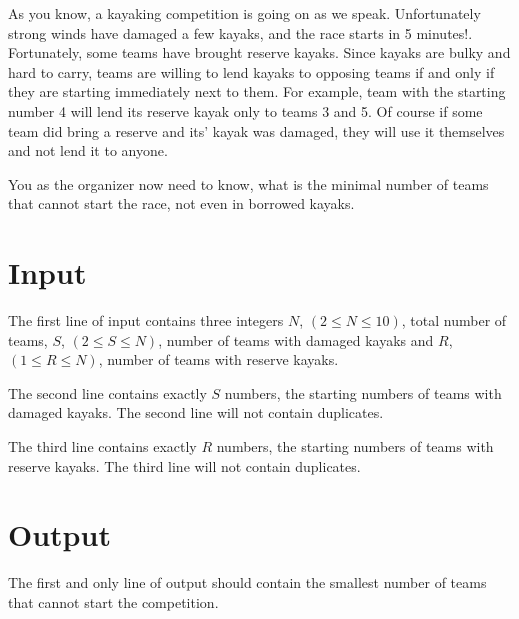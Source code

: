
As you know, a kayaking competition is going on as we speak. Unfortunately
strong winds have damaged a few kayaks, and the race starts in 5 minutes!.
Fortunately, some teams have brought reserve kayaks. Since kayaks are
bulky and hard to carry, teams are willing to lend kayaks to opposing teams
if and only if they are starting immediately next to them. For example, team
with the starting number 4 will lend its reserve kayak only to teams 3 and 5.
Of course if some team did bring a reserve and its' kayak was damaged, they
will use it themselves and not lend it to anyone.

You as the organizer now need to know, what is the minimal number of teams
that cannot start the race, not even in borrowed kayaks.

\section*{Input}
The first line of input contains three integers $N$, $(2 \le N \le 10)$, total number of teams, $S$,
$(2 \le S \le N)$, number of teams with damaged kayaks and $R$, $(1 \le R \le N)$, number of teams with
reserve kayaks.

The second line contains exactly $S$ numbers, the starting numbers of teams with damaged kayaks. The
second line will not contain duplicates.

The third line contains exactly $R$ numbers, the starting numbers of teams with reserve kayaks. The
third line will not contain duplicates.

\section*{Output}
The first and only line of output should contain the smallest number of teams
that cannot start the competition.

